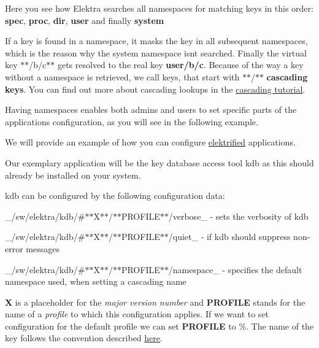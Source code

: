 Here you see how Elektra searches all namespaces for matching keys in this order\+: {\bfseries spec}, {\bfseries proc}, {\bfseries dir}, {\bfseries user} and finally {\bfseries system}

If a key is found in a namespace, it masks the key in all subsequent namespaces, which is the reason why the system namespace isn\textquotesingle{}t searched. Finally the virtual key $\ast$$\ast$/b/c$\ast$$\ast$ gets resolved to the real key {\bfseries user/b/c}. Because of the way a key without a namespace is retrieved, we call keys, that start with \textquotesingle{}$\ast$$\ast$/$\ast$$\ast$\textquotesingle{} {\bfseries cascading keys}. You can find out more about cascading lookups in the \hyperlink{doc_tutorials_cascading_md}{cascading tutorial}.

Having namespaces enables both admins and users to set specific parts of the application\textquotesingle{}s configuration, as you will see in the following example.

We will provide an example of how you can configure \hyperlink{doc_help_elektra-glossary_md}{elektrified} applications.

Our exemplary application will be the key database access tool {\ttfamily kdb} as this should already be installed on your system.

{\ttfamily kdb} can be configured by the following configuration data\+:


\begin{DoxyItemize}
\item \+\_\+/sw/elektra/kdb/\#$\ast$$\ast$\+X$\ast$$\ast$/$\ast$$\ast$\+P\+R\+O\+F\+I\+L\+E$\ast$$\ast$/verbose\+\_\+ -\/ sets the verbosity of kdb
\item \+\_\+/sw/elektra/kdb/\#$\ast$$\ast$\+X$\ast$$\ast$/$\ast$$\ast$\+P\+R\+O\+F\+I\+L\+E$\ast$$\ast$/quiet\+\_\+ -\/ if kdb should suppress non-\/error messages
\item \+\_\+/sw/elektra/kdb/\#$\ast$$\ast$\+X$\ast$$\ast$/$\ast$$\ast$\+P\+R\+O\+F\+I\+L\+E$\ast$$\ast$/namespace\+\_\+ -\/ specifies the default namespace used, when setting a cascading name
\end{DoxyItemize}

{\bfseries X} is a placeholder for the {\itshape major version number} and {\bfseries P\+R\+O\+F\+I\+LE} stands for the name of a {\itshape profile} to which this configuration applies. If we want to set configuration for the default profile we can set {\bfseries P\+R\+O\+F\+I\+LE} to \%. The name of the key follows the convention described \hyperlink{doc_help_elektra-key-names_md}{here}.

